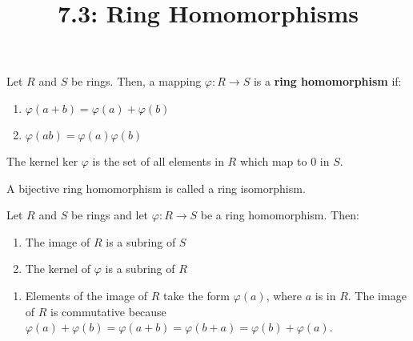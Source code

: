\documentclass{article}
\title{7.3: Ring Homomorphisms}
\begin{document}
\maketitle

\begin{definition}
Let $R$ and $S$ be rings. Then, a mapping $\varphi: R \to S$ is a \textbf{ring homomorphism} if:

\begin{enumerate}
    \item $\varphi(a+b) = \varphi(a) + \varphi(b)$
    \item $\varphi(ab) = \varphi(a)\varphi(b)$
\end{enumerate}

The kernel $\text{ker } \varphi$ is the set of all elements in $R$ which map to $0$ in $S$. 

A bijective ring homomorphism is called a ring isomorphism.
\end{definition}

\begin{proposition}
Let $R$ and $S$ be rings and let $\varphi: R \to S$ be a ring homomorphism. Then:
\begin{enumerate}
    \item The image of $R$ is a subring of $S$
    \item The kernel of $\varphi$ is a subring of $R$
\end{enumerate}
\end{proposition}

\begin{customproof}
\begin{enumerate}
    \item Elements of the image of $R$ take the form $\varphi(a)$, where $a$ is in $R$. The image of $R$ is commutative because $\varphi(a) + \varphi(b) = \varphi(a+b) = \varphi (b+a) = \varphi(b)+\varphi(a)$. 
\end{enumerate}
\end{customproof}
\end{document}
